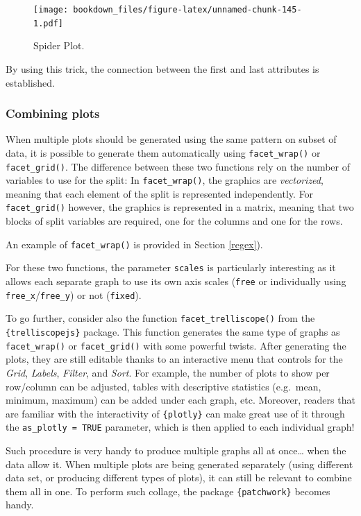 \documentclass[
]{krantz}
\begin{document}
\begin{figure}
\centering
\texttt{[image: bookdown\_files/figure-latex/unnamed-chunk-145-1.pdf]}
\caption{\label{fig:unnamed-chunk-145}Spider Plot.}
\end{figure}

By using this trick, the connection between the first and last attributes is established.

\hypertarget{combiningplots}{%
\subsubsection*{Combining plots}\label{combiningplots}}


When multiple plots should be generated using the same pattern on subset of data, it is possible to generate them automatically using \texttt{facet\_wrap()} or \texttt{facet\_grid()}. The difference between these two functions rely on the number of variables to use for the split: In \texttt{facet\_wrap()}, the graphics are \emph{vectorized}, meaning that each element of the split is represented independently. For \texttt{facet\_grid()} however, the graphics is represented in a matrix, meaning that two blocks of split variables are required, one for the columns and one for the rows.

An example of \texttt{facet\_wrap()} is provided in Section \ref{regex}).

For these two functions, the parameter \texttt{scales} is particularly interesting as it allows each separate graph to use its own axis scales (\texttt{free} or individually using \texttt{free\_x}/\texttt{free\_y}) or not (\texttt{fixed}).

To go further, consider also the function \texttt{facet\_trelliscope()} from the \texttt{\{trelliscopejs\}} package. This function generates the same type of graphs as \texttt{facet\_wrap()} or \texttt{facet\_grid()} with some powerful twists. After generating the plots, they are still editable thanks to an interactive menu that controls for the \emph{Grid}, \emph{Labels}, \emph{Filter}, and \emph{Sort}. For example, the number of plots to show per row/column can be adjusted, tables with descriptive statistics (e.g.~mean, minimum, maximum) can be added under each graph, etc. Moreover, readers that are familiar with the interactivity of \texttt{\{plotly\}} can make great use of it through the \texttt{as\_plotly\ =\ TRUE} parameter, which is then applied to each individual graph!

Such procedure is very handy to produce multiple graphs all at once\ldots{} when the data allow it.
When multiple plots are being generated separately (using different data set, or producing different types of plots), it can still be relevant to combine them all in one. To perform such collage, the package \texttt{\{patchwork\}} becomes handy.
\end{document}
